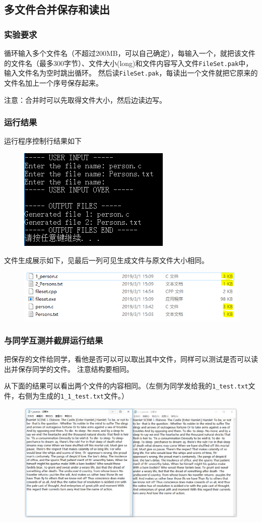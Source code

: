 \documentclass[logo,reportComp]{thesis}
\begin{document}
\subsection{多文件合并保存和读出}
\subsubsection{实验要求}
循环输入多个文件名（不超过200MB，可以自己确定），每输入一个，就把该文件的文件名（最多300字节）、文件大小(long)和文件内容写入文件\verb'FileSet.pak'中，输入文件名为空时跳出循环。
然后读\verb'FileSet.pak'，每读出一个文件就把它原来的文件名加上一个序号保存起来。

注意：合并时可以先取得文件大小，然后边读边写。

\subsubsection{运行结果}
运行程序控制行结果如下
\begin{figure}[H]
\centering
\includegraphics[width=0.4\linewidth]{fig/file-copy.PNG}
\end{figure}

文件生成展示如下，见最后一列可见生成文件与原文件大小相同。
\begin{figure}[H]
\centering
\includegraphics[width=0.7\linewidth]{fig/file-copy-res.PNG}
\end{figure}

\subsubsection{与同学互测并截屏运行结果}
把保存的文件给同学，看他是否可以可以取出其中文件，同样可以测试是否可以读出并保存同学的文件。
注意结构要相同。

从下面的结果可以看出两个文件的内容相同。（左侧为同学发给我的\verb'1_test.txt'文件，右侧为生成的\verb'1_1_test.txt'文件。）
\begin{figure}[H]
\centering
\includegraphics[width=0.8\linewidth]{fig/test.PNG}
\end{figure}
\end{document}

